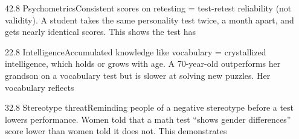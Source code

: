 \documentclass[11pt]{article}
\begin{document}
\begin{q}{4}{2.8 Psychometrics}{Consistent scores on retesting = test-retest reliability (not validity).}
A student takes the same personality test twice, a month apart, and gets nearly identical scores. This shows the test has
\end{q}

\begin{q}{2}{2.8 Intelligence}{Accumulated knowledge like vocabulary = crystallized intelligence, which holds or grows with age.}
A 70-year-old outperforms her grandson on a vocabulary test but is slower at solving new puzzles. Her vocabulary reflects
\end{q}

\begin{q}{3}{2.8 Stereotype threat}{Reminding people of a negative stereotype before a test lowers performance.}
Women told that a math test ``shows gender differences'' score lower than women told it does not. This demonstrates
\end{q}

\makekey
\end{document}
